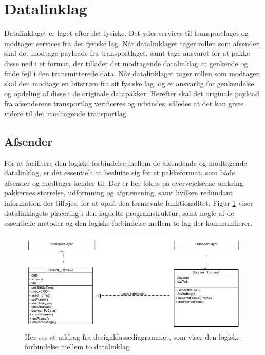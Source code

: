 \section{Datalinklag}
Datalinklaget er laget efter det fysiske. Det yder services til transportlaget og modtager services fra det fysiske lag.
Når datalinklaget tager rollen som afsender, skal det modtage payloads fra transportlaget, samt tage ansvaret for at pakke disse ned i et format, der tillader det modtagende datalinklag at genkende og finde fejl i den transmitterede data.
Når datalinklaget tager rollen som modtager, skal den modtage en bitstrøm fra sit fysiske lag, og er ansvarlig for genkendelse og opdeling af disse i de originale datapakker.
Herefter skal det originale payload fra afsenderens transportlag verificeres og udvindes, således at det kan gives videre til det modtagende transportlag.

\subsection{Afsender}
For at facilitere den logiske forbindelse mellem de afsendende og modtagende datalinklag, er det essentielt at beslutte sig for et pakkeformat, som både afsender og modtager kender til. Der er her fokus på overvejelserne omkring pakkernes størrelse, udformning og afgrænsning, samt hvilken redundant information der tilføjes, for at opnå den førnævnte funktionalitet. Figur \ref{fig:DataLinkLogical} viser datalinklagets placering i den lagdelte programstruktur, samt nogle af de essentielle metoder og den logiske forbindelse mellem to lag der kommunikerer.

\begin{figure}[h!]
\centering
\includegraphics[scale=0.7]{Billeder/DataLinkLogical.PNG}
\caption{Her ses et uddrag fra designklassediagrammet, som viser den logiske forbindelse mellem to datalinklag}
\label{fig:DataLinkLogical}
\end{figure}

